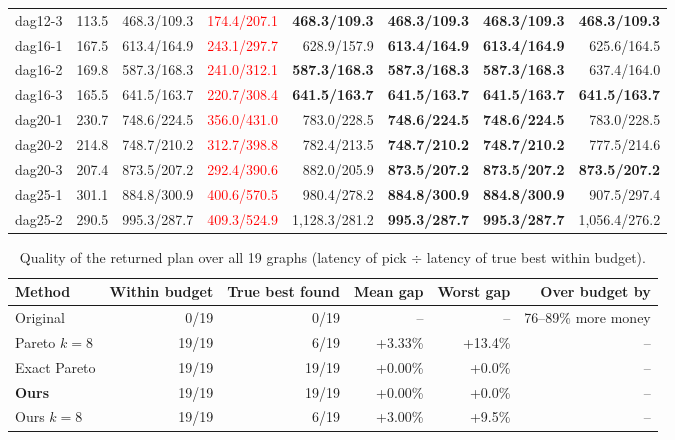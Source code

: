 \documentclass[10pt,a4paper]{article}
\begin{document}
{\begin{longtable}{@{}lr|r|rrrrr@{}}
dag12-3 & 113.5 & 468.3/109.3 & \textcolor{red}{174.4/207.1} & \textbf{468.3/109.3} & \textbf{468.3/109.3} & \textbf{468.3/109.3} & \textbf{468.3/109.3}\\
dag16-1 & 167.5 & 613.4/164.9 & \textcolor{red}{243.1/297.7} & 628.9/157.9 & \textbf{613.4/164.9} & \textbf{613.4/164.9} & 625.6/164.5\\
dag16-2 & 169.8 & 587.3/168.3 & \textcolor{red}{241.0/312.1} & \textbf{587.3/168.3} & \textbf{587.3/168.3} & \textbf{587.3/168.3} & 637.4/164.0\\
dag16-3 & 165.5 & 641.5/163.7 & \textcolor{red}{220.7/308.4} & \textbf{641.5/163.7} & \textbf{641.5/163.7} & \textbf{641.5/163.7} & \textbf{641.5/163.7}\\
dag20-1 & 230.7 & 748.6/224.5 & \textcolor{red}{356.0/431.0} & 783.0/228.5 & \textbf{748.6/224.5} & \textbf{748.6/224.5} & 783.0/228.5\\
dag20-2 & 214.8 & 748.7/210.2 & \textcolor{red}{312.7/398.8} & 782.4/213.5 & \textbf{748.7/210.2} & \textbf{748.7/210.2} & 777.5/214.6\\
dag20-3 & 207.4 & 873.5/207.2 & \textcolor{red}{292.4/390.6} & 882.0/205.9 & \textbf{873.5/207.2} & \textbf{873.5/207.2} & \textbf{873.5/207.2}\\
dag25-1 & 301.1 & 884.8/300.9 & \textcolor{red}{400.6/570.5} & 980.4/278.2 & \textbf{884.8/300.9} & \textbf{884.8/300.9} & 907.5/297.4\\
dag25-2 & 290.5 & 995.3/287.7 & \textcolor{red}{409.3/524.9} & 1{,}128.3/281.2 & \textbf{995.3/287.7} & \textbf{995.3/287.7} & 1{,}056.4/276.2\\
\bottomrule
\end{longtable}}

\begin{table}[h]\centering\small
\caption{Quality of the returned plan over all 19 graphs (latency of pick $\div$ latency of true best within budget).}\label{tab:gap}
\begin{tabular}{@{}lrrrrr@{}}
\toprule
Method & Within budget & True best found & Mean gap & Worst gap & Over budget by\\
\midrule
Original & 0/19 & 0/19 & -- & -- & 76--89\% more money\\
Pareto $k{=}8$ & 19/19 & 6/19 & +3.33\% & +13.4\% & --\\
Exact Pareto & 19/19 & 19/19 & +0.00\% & +0.0\% & --\\
\textbf{Ours} & 19/19 & 19/19 & +0.00\% & +0.0\% & --\\
Ours $k{=}8$ & 19/19 & 6/19 & +3.00\% & +9.5\% & --\\
\bottomrule
\end{tabular}
\end{table}
\end{document}
